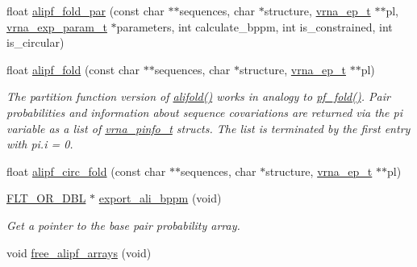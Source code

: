 \begin{DoxyCompactItemize}
\item 
float \hyperlink{group__part__func__global__deprecated_gab46954fb0ed3b6d5631e7f9b802978cd}{alipf\+\_\+fold\+\_\+par} (const char $\ast$$\ast$sequences, char $\ast$structure, \hyperlink{group__struct__utils__plist_gab9ac98ab55ded9fb90043b024b915aca}{vrna\+\_\+ep\+\_\+t} $\ast$$\ast$pl, \hyperlink{group__energy__parameters_ga01d8b92fe734df8d79a6169482c7d8d8}{vrna\+\_\+exp\+\_\+param\+\_\+t} $\ast$parameters, int calculate\+\_\+bppm, int is\+\_\+constrained, int is\+\_\+circular)
\item 
float \hyperlink{group__part__func__global__deprecated_ga1a5f6cfb9d761fa862ce4edc7c369cd2}{alipf\+\_\+fold} (const char $\ast$$\ast$sequences, char $\ast$structure, \hyperlink{group__struct__utils__plist_gab9ac98ab55ded9fb90043b024b915aca}{vrna\+\_\+ep\+\_\+t} $\ast$$\ast$pl)
\begin{DoxyCompactList}\small\item\em The partition function version of \hyperlink{group__mfe__global__deprecated_ga4cf00f0659e5f0480335d69e797f05b1}{alifold()} works in analogy to \hyperlink{group__part__func__global__deprecated_gadc3db3d98742427e7001a7fd36ef28c2}{pf\+\_\+fold()}. Pair probabilities and information about sequence covariations are returned via the \textquotesingle{}pi\textquotesingle{} variable as a list of \hyperlink{group__aln__utils_ga6660dfca23debee7306e0cd53341263f}{vrna\+\_\+pinfo\+\_\+t} structs. The list is terminated by the first entry with pi.\+i = 0. \end{DoxyCompactList}\item 
float \hyperlink{group__part__func__global__deprecated_ga604a42ad64178279551ad3e4def3d603}{alipf\+\_\+circ\+\_\+fold} (const char $\ast$$\ast$sequences, char $\ast$structure, \hyperlink{group__struct__utils__plist_gab9ac98ab55ded9fb90043b024b915aca}{vrna\+\_\+ep\+\_\+t} $\ast$$\ast$pl)
\item 
\hyperlink{group__data__structures_ga31125aeace516926bf7f251f759b6126}{F\+L\+T\+\_\+\+O\+R\+\_\+\+D\+BL} $\ast$ \hyperlink{group__part__func__global__deprecated_ga11b6ab8bd9be1821fea352b190a01cab}{export\+\_\+ali\+\_\+bppm} (void)
\begin{DoxyCompactList}\small\item\em Get a pointer to the base pair probability array. \end{DoxyCompactList}\item 
void \hyperlink{group__part__func__global__deprecated_ga0c0498f35686e26b38ee460d3db1a661}{free\+\_\+alipf\+\_\+arrays} (void)

\end{DoxyCompactItemize}

